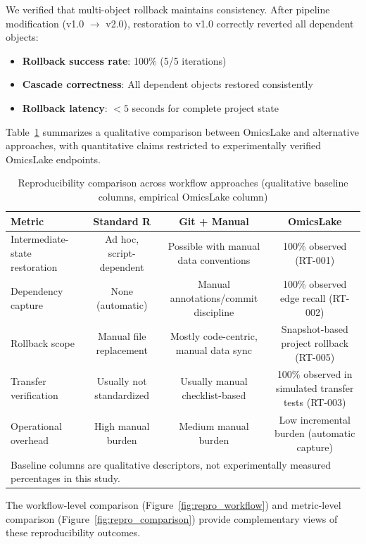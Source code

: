 \documentclass[11pt,a4paper]{article}
\begin{document}
We verified that multi-object rollback maintains consistency. After pipeline modification (v1.0 $\rightarrow$ v2.0), restoration to v1.0 correctly reverted all dependent objects:

\begin{itemize}
    \item \textbf{Rollback success rate}: 100\% (5/5 iterations)
    \item \textbf{Cascade correctness}: All dependent objects restored consistently
    \item \textbf{Rollback latency}: $< 5$ seconds for complete project state
\end{itemize}

Table~\ref{tab:reproducibility_summary} summarizes a qualitative comparison between OmicsLake and alternative approaches, with quantitative claims restricted to experimentally verified OmicsLake endpoints.

\begin{table}[H]
\centering
\caption{Reproducibility comparison across workflow approaches (qualitative baseline columns, empirical OmicsLake column)}
\label{tab:reproducibility_summary}
\begin{tabular}{lccc}
\toprule
\textbf{Metric} & \textbf{Standard R} & \textbf{Git + Manual} & \textbf{OmicsLake} \\
\midrule
Intermediate-state restoration & Ad hoc, script-dependent & Possible with manual data conventions & 100\% observed (RT-001) \\
Dependency capture & None (automatic) & Manual annotations/commit discipline & 100\% observed edge recall (RT-002) \\
Rollback scope & Manual file replacement & Mostly code-centric, manual data sync & Snapshot-based project rollback (RT-005) \\
Transfer verification & Usually not standardized & Usually manual checklist-based & 100\% observed in simulated transfer tests (RT-003) \\
Operational overhead & High manual burden & Medium manual burden & Low incremental burden (automatic capture) \\
\bottomrule
\multicolumn{4}{l}{\footnotesize Baseline columns are qualitative descriptors, not experimentally measured percentages in this study.}
\end{tabular}
\end{table}

The workflow-level comparison (Figure~\ref{fig:repro_workflow}) and metric-level comparison (Figure~\ref{fig:repro_comparison}) provide complementary views of these reproducibility outcomes.
\end{document}
